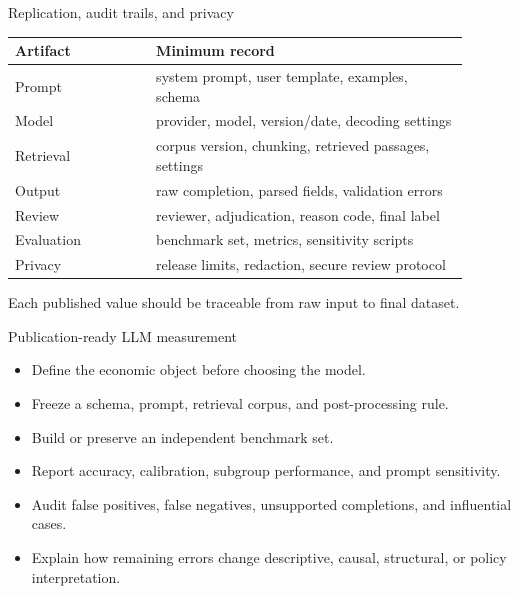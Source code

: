 \documentclass[aspectratio=169,11pt]{beamer}
\newcommand{\1}{\mathbf{1}}
\begin{document}
\begin{frame}{Replication, audit trails, and privacy}
\small
\begin{tabular}{p{0.28\linewidth} p{0.62\linewidth}}
\toprule
Artifact & Minimum record \\
\midrule
Prompt & system prompt, user template, examples, schema \\
Model & provider, model, version/date, decoding settings \\
Retrieval & corpus version, chunking, retrieved passages, settings \\
Output & raw completion, parsed fields, validation errors \\
Review & reviewer, adjudication, reason code, final label \\
Evaluation & benchmark set, metrics, sensitivity scripts \\
Privacy & release limits, redaction, secure review protocol \\
\bottomrule
\end{tabular}

\medskip
Each published value should be traceable from raw input to final dataset.
\end{frame}

\begin{frame}{Publication-ready LLM measurement}
\begin{itemize}
    \item Define the economic object before choosing the model.
    \item Freeze a schema, prompt, retrieval corpus, and post-processing rule.
    \item Build or preserve an independent benchmark set.
    \item Report accuracy, calibration, subgroup performance, and prompt sensitivity.
    \item Audit false positives, false negatives, unsupported completions, and influential cases.
    \item Explain how remaining errors change descriptive, causal, structural, or policy interpretation.
\end{itemize}
\end{frame}
\end{document}
